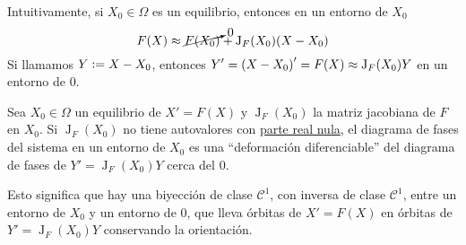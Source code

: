 Intuitivamente, si $X_0 \in \Omega$ es un equilibrio, entonces en un entorno de $X_0$
\[F(X) \approx \cancelto{0}{F(X_0)} + \operatorname{J}_F(X_0)(X-X_0)\]
Si llamamos $Y\vcentcolon= X-X_0$, entonces $\displaystyle Y' = \left(X-X_0\right)' = F(X) \approx \operatorname{J}_F(X_0)Y$ en un entorno de $0$.

\begin{teo}
	Sea $X_0 \in \Omega$ un equilibrio de $X'=F(X)$ y $\operatorname{J}_F(X_0)$ la matriz jacobiana de $F$ en $X_0$. Si $\operatorname{J}_F(X_0)$ no tiene autovalores con \underline{parte real nula}, el diagrama de fases del sistema en un entorno de $X_0$ es una ``deformación diferenciable'' del diagrama de fases de $Y' = \operatorname{J}_F(X_0)Y$ cerca del 0.

	Esto significa que hay una biyección de clase $\mathcal{C}^1$, con inversa de clase $\mathcal{C}^1$, entre un entorno de $X_0$ y un entorno de 0, que lleva órbitas de $X'=F(X)$ en órbitas de $Y' = \operatorname{J}_F(X_0)Y$ conservando la orientación.
\end{teo}